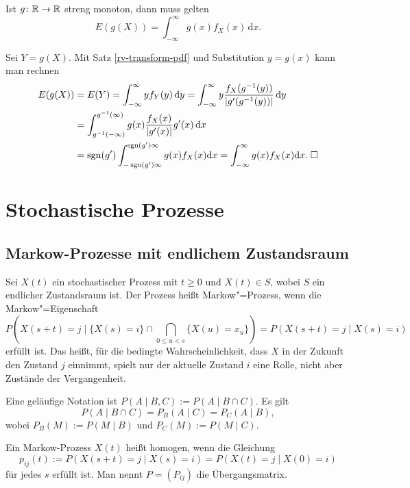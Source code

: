 \begin{Satz}\newlinefirst
Ist $g\colon\mathbb R\to\mathbb R$ streng monoton, dann muss gelten
\[E(g(X)) = \int_{-\infty}^\infty g(x)f_X(x)\,\mathrm dx.\]
\end{Satz}
 Sei $Y=g(X)$. Mit Satz \ref{rv-transform-pdf}
und Substitution $y=g(x)$ kann man rechnen
\begin{align*}
E(g(X)) &= E(Y) = \int_{-\infty}^\infty yf_Y(y)\,\mathrm dy
= \int_{-\infty}^\infty y\frac{f_X(g^{-1}(y))}{|g'(g^{-1}(y))|}\,\mathrm dy\\
&= \int_{g^{-1}(-\infty)}^{g^{-1}(\infty)} g(x)
\frac{f_X(x)}{|g'(x)|}g'(x)\,\mathrm dx\\
&= \operatorname{sgn}(g')\int_{-\operatorname{sgn}(g')\infty}^{\operatorname{sgn}(g')\infty}g(x) f_X(x)\mathrm dx
= \int_{-\infty}^\infty g(x) f_X(x)\mathrm dx.\;\square
\end{align*}

\newpage
\section{Stochastische Prozesse}%

\subsection{Markow-Prozesse mit endlichem Zustandsraum}

\begin{Definition}
Sei $X(t)$ ein stochastischer Prozess mit $t\ge 0$ und $X(t)\in S$,
wobei $S$ ein endlicher Zustandsraum ist. Der Prozess heißt
Markow"=Prozess, wenn die Markow"=Eigenschaft
\[P(X(s+t)=j\mid \{X(s)=i\}\cap\bigcap_{0\le u<s}\{X(u)=x_u\}) = P(X(s+t)=j\mid X(s)=i)\]
erfüllt ist. Das heißt, für die bedingte Wahrscheinlichkeit, dass
$X$ in der Zukunft den Zustand $j$ einnimmt, spielt nur der aktuelle
Zustand $i$ eine Rolle, nicht aber Zustände der Vergangenheit.
\end{Definition}

\noindent
{} Eine geläufige Notation
ist $P(A\mid B,C):=P(A\mid B\cap C).$ Es gilt
\[P(A\mid B\cap C) = P_B(A\mid C) = P_C(A\mid B),\]
wobei $P_B(M):=P(M\mid B)$ und $P_C(M):=P(M\mid C)$.

\begin{Definition}%
Ein Markow-Prozess $X(t)$ heißt homogen, wenn die Gleichung
\[p_{ij}(t) := P(X(s+t)=j\mid X(s)=i) = P(X(t)=j\mid X(0)=i)\]
für jedes $s$ erfüllt ist. Man nennt $P=(P_{ij})$ die Übergangsmatrix.
\end{Definition}

